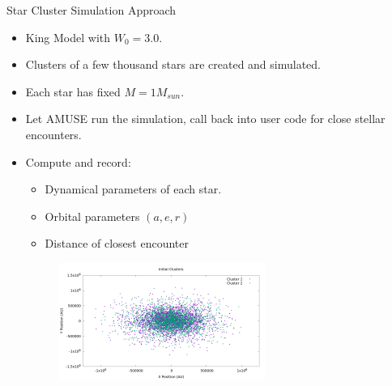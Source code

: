 \documentclass{beamer}
\begin{document}
\begin{frame}{Star Cluster Simulation Approach}
    \begin{itemize}
        \item King Model with $W_0 = 3.0$.
        \item Clusters of a few thousand stars are created and simulated.
        \item Each star has fixed $M = 1 M_{sun}$.
        \item Let AMUSE run the simulation, call back into user code for close
            stellar encounters.
        \item Compute and record:
            \begin{itemize}
                \item Dynamical parameters of each star.
                \item Orbital parameters $(a, e, r)$
                \item Distance of closest encounter
            \end{itemize}
        \begin{figure}
            \centering
            \includegraphics[height=1.5in]{cluster_superimposed.png}
        \end{figure}
    \end{itemize}

\end{frame}
\end{document}
